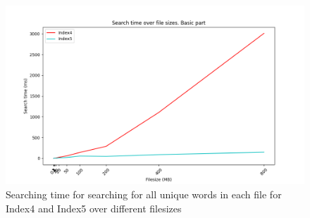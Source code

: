 \begin{figure}[H]
    \centering
    \includegraphics[width=.8\textwidth]{LaTeX/Pictures/Results/BPSearch[4, 5].png}
    \caption{Searching time for searching for all unique words in each file for Index4 and Index5 over different filesizes}
    \label{fig:BPsearch45}
\end{figure} 




